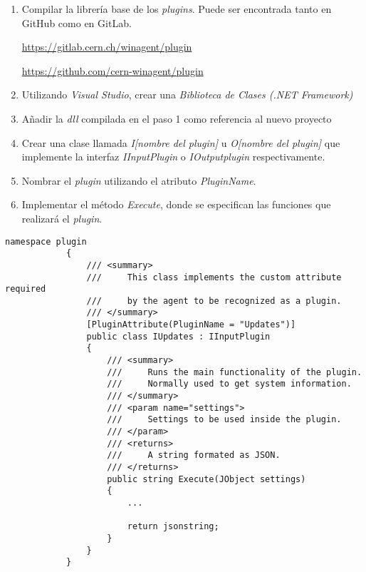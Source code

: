         \begin{enumerate}
            \item Compilar la librería base de los \textit{plugins}. Puede ser encontrada tanto en GitHub como en GitLab.
            
            \url{https://gitlab.cern.ch/winagent/plugin}
            
            \url{https://github.com/cern-winagent/plugin}
            
            \item Utilizando \textit{Visual Studio}, crear una \textit{Biblioteca de Clases (.NET Framework)}
            
            \item Añadir la \textit{dll} compilada en el paso 1 como referencia al nuevo proyecto
            
            \item Crear una clase llamada \textit{I[nombre del plugin]} u \textit{O[nombre del plugin]} que implemente la interfaz \textit{IInputPlugin} o \textit{IOutputplugin} respectivamente.
            
            \item Nombrar el \textit{plugin} utilizando el atributo \textit{PluginName}.
            
            \item Implementar el método \textit{Execute}, donde se especifican las funciones que realizará el \textit{plugin}.
        \end{enumerate}
    
        \begin{lstlisting}[style=csharp, caption=Plugin de entrada]
            namespace plugin
            {
                /// <summary>
                ///     This class implements the custom attribute required
                ///     by the agent to be recognized as a plugin.
                /// </summary>
                [PluginAttribute(PluginName = "Updates")]
                public class IUpdates : IInputPlugin
                {
                    /// <summary>
                    ///     Runs the main functionality of the plugin.
                    ///     Normally used to get system information.
                    /// </summary>
                    /// <param name="settings">
                    ///     Settings to be used inside the plugin.
                    /// </param>
                    /// <returns>
                    ///     A string formated as JSON.
                    /// </returns>
                    public string Execute(JObject settings)
                    {
                        ...
            
                        return jsonstring;
                    }
                }
            }
        \end{lstlisting}
        
